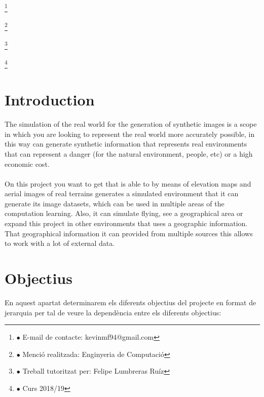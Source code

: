 \documentclass[10pt,a4paper,twocolumn,twoside]{article}
\newcommand\blfootnote[1]{%
  \begingroup
  \renewcommand\thefootnote{}\footnote{#1}%
  \addtocounter{footnote}{-1}%
  \endgroup
}
\begin{document}
\blfootnote{$\bullet$ E-mail de contacte: kevinmf94@gmail.com}
\blfootnote{$\bullet$ Menció realitzada: Enginyeria de Computació}
\blfootnote{$\bullet$ Treball tutoritzat per: Felipe Lumbreras Ruíz}
\blfootnote{$\bullet$ Curs 2018/19}

\vspace{-1cm}
\section{Introduction}
The simulation of the real world for the generation of synthetic images is a scope in which you are looking to represent the real world more accurately possible, in this way can generate synthetic information that represents real environments that can represent a danger (for the natural environment, people, etc) or a high economic cost.
\\
\\
On this project you want to get that is able to by means of elevation maps and aerial images of real terrains generates a simulated environment that it can generate its image datasets, which can be used in multiple areas of the computation learning. Also, it can simulate flying, see a geographical area or expand this project in other environments that uses a geographic information. That geographical information it can provided from multiple sources this allows to work with a lot of external data.

\section{Objectius}

En aquest apartat determinarem els diferents objectius del projecte en format de jerarquia per tal de veure la dependència entre els diferents objectius:
\end{document}
